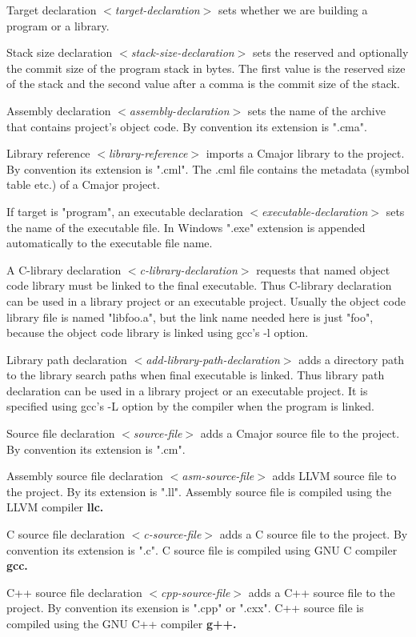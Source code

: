\documentclass[a4paper,oneside,11pt]{article}
\begin{document}
Target declaration \emph{$<$target-declaration$>$} sets whether we are building a program or a library.

Stack size declaration \emph{$<$stack-size-declaration$>$} sets the reserved and optionally the commit size
of the program stack in bytes.
The first value is the reserved size of the stack and the second value after a comma is the commit size of the stack.

Assembly declaration \emph{$<$assembly-declaration$>$} sets the name of the archive that contains project's object code.
By convention its extension is ".cma".

Library reference \emph{$<$library-reference$>$} imports a Cmajor library to the project.
By convention its extension is ".cml".
The .cml file contains the metadata (symbol table etc.) of a Cmajor project.

If target is "program", an executable declaration \emph{$<$executable-declaration$>$}
sets the name of the executable file.
In Windows ".exe" extension is appended automatically to the executable file name.

A C-library declaration \emph{$<$c-library-declaration$>$}
requests that named object code library must be linked to the final executable.
Thus C-library declaration can be used in a library project or an executable project.
Usually the object code library file is named "libfoo.a", but the link name needed here is just "foo",
because the object code library is linked using gcc's -l option.

Library path declaration \emph{$<$add-library-path-declaration$>$}
adds a directory path to the library search paths when final executable is linked.
Thus library path declaration can be used in a library project or an executable project.
It is specified using gcc's -L option by the compiler when the program is linked.

Source file declaration \emph{$<$source-file$>$} adds a Cmajor source file to the project.
By convention its extension is ".cm".

Assembly source file declaration \emph{$<$asm-source-file$>$} adds LLVM source file to the project.
By its extension is ".ll". Assembly source file is compiled using the LLVM compiler \bf{llc}.

C source file declaration \emph{$<$c-source-file$>$} adds a C source file to the project.
By convention its extension is ".c". C source file is compiled using GNU C compiler \bf{gcc}.

C++ source file declaration \emph{$<$cpp-source-file$>$} adds a C++ source file to the project.
By convention its exension is ".cpp" or ".cxx".
C++ source file is compiled using the GNU C++ compiler \bf{g++}.
\end{document}
